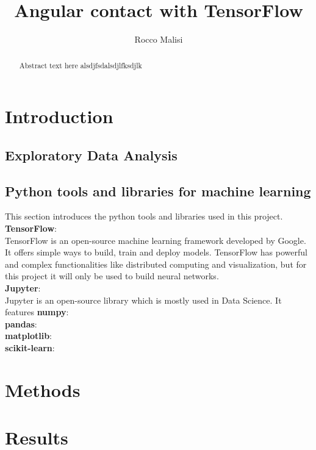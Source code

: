 \documentclass[letterpaper,10pt]{article}
\title{Angular contact with TensorFlow}
\author{Rocco Malisi}
\begin{document}
	\maketitle
	\newpage
	
	\begin{abstract}
		Abstract text here alsdjfsdalsdjlfksdjlk
	\end{abstract}
	\newpage
	
	\tableofcontents
	\newpage
	
	\section{Introduction}
	\subsection{Exploratory Data Analysis}
	
	\subsection{Python tools and libraries for machine learning}
	This section introduces the python tools and libraries used in this project. \\
	\textbf{TensorFlow}: \\ TensorFlow is an open-source machine learning framework developed by Google. It offers simple ways to build, train and deploy models. TensorFlow has powerful and complex functionalities like distributed computing and visualization, but for this project it will only be used to build neural networks.\cite{tensorflow2015-whitepaper} \\
	\textbf{Jupyter}: \\ Jupyter is an open-source library which is mostly used in Data Science. It features \cite{jupyter}
	\textbf{numpy}: \\
	\textbf{pandas}: \\
	\textbf{matplotlib}: \\
	\textbf{scikit-learn}: \\
	\section{Methods}
	\section{Results}
\end{document}
